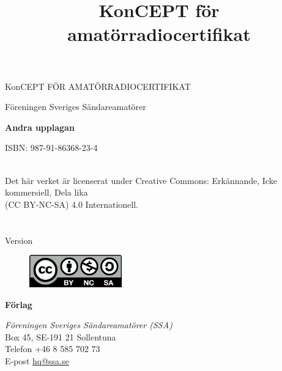 \onecolumn{}
\vspace{10em}
\title{KonCEPT för amatörradiocertifikat}
\begin{center}
\Large{KonCEPT FÖR AMATÖRRADIOCERTIFIKAT}

Föreningen Sveriges Sändareamatörer\\[2\baselineskip]
\end{center}

\noindent \textbf{Andra upplagan}

\noindent ISBN: 987-91-86368-23-4

\noindent
\\
\noindent Det här verket är licenserat under Creative Commons:\newline
\noindent Erkännande, Icke kommersiell, Dela lika\\
\noindent (CC BY-NC-SA) 4.0 Internationell.\\
\\
\\
\noindent Version \revision

\begin{figure}[h]
    \includegraphics[width=4cm]{images/cc-by-nc-sa}
\end{figure}


\vfill

\noindent
\textbf{Förlag}

\noindent
\textit{Föreningen Sveriges Sändareamatörer (SSA)}\\
Box 45, SE-191 21 Sollentuna\\
Telefon +46 8 585 702 73\\
E-post \href{mailto:hq@ssa.se}{hq@ssa.se}\\[\baselineskip]
\restoregeometry\twocolumn
